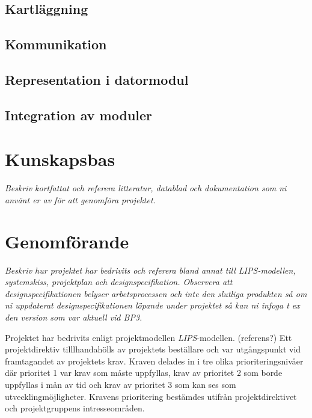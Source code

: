 \documentclass[11pt]{article}
\begin{document}
\begin{flushleft}
\subsection{Kartläggning}

\subsection{Kommunikation}

\subsection{Representation i datormodul}

\subsection{Integration av moduler}




\pagebreak

\section{Kunskapsbas}
\textit{Beskriv kortfattat och referera litteratur, datablad och dokumentation som ni använt er av för att genomföra projektet.}

\pagebreak

\section{Genomförande}

\textit{Beskriv hur projektet har bedrivits och referera bland annat till LIPS-modellen, systemskiss, projektplan och designspecifikation. Observera att designspecifikationen belyser arbetsprocessen och inte den slutliga produkten så om ni uppdaterat designspecifikationen löpande under projektet så kan ni infoga t ex den version som var aktuell vid BP3.}

Projektet har bedrivits enligt projektmodellen \textit{LIPS}-modellen. (referens?) Ett projektdirektiv tilllhandahölls av projektets beställare och var utgångspunkt vid framtagandet av projektets krav. Kraven delades in i tre olika prioriteringsnivåer där prioritet 1 var krav som måste uppfyllas, krav av prioritet 2 som borde uppfyllas i mån av tid och krav av prioritet 3 som kan ses som utvecklingmöjligheter. Kravens prioritering bestämdes utifrån projektdirektivet och projektgruppens intresseområden. 


\end{flushleft}
\end{document}
